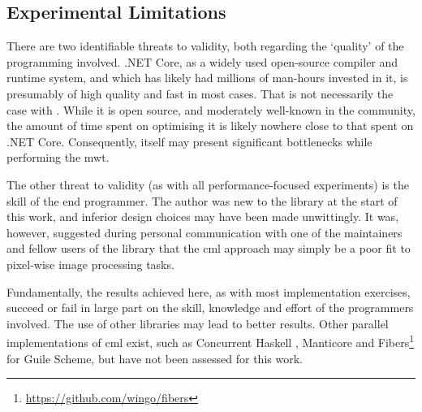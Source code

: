 \subsection{Experimental Limitations}
There are two identifiable threats to validity, both regarding the `quality' of the programming involved.  .NET Core, as a widely used open-source compiler and runtime system, and which has likely had millions of man-hours invested in it, is presumably of high quality and fast in most cases.  That is not necessarily the case with \hopac{}.  While it is open source, and moderately well-known in the \fsharp{} community, the amount of time spent on optimising it is likely nowhere close to that spent on .NET Core.  Consequently, \hopac{} itself may present significant bottlenecks while performing the \gls{mwt}.

The other threat to validity (as with all performance-focused experiments) is the skill of the end programmer.  The author was new to the \hopac{} library at the start of this work, and inferior design choices may have been made unwittingly.  It was, however, suggested during personal communication with one of the maintainers and fellow users of the \hopac{} library that the \gls{cml} approach may simply be a poor fit to pixel-wise image processing tasks.

Fundamentally, the results achieved here, as with most implementation exercises, succeed or fail in large part on the skill, knowledge and effort of the programmers involved.  The use of other libraries may lead to better results.  Other parallel implementations of \gls{cml} exist, such as Concurrent Haskell \cite{Chaudhuri2009}, Manticore \cite{Reppy2009a} and Fibers\footnote{\url{https://github.com/wingo/fibers}} for Guile Scheme, but have not been assessed for this work.